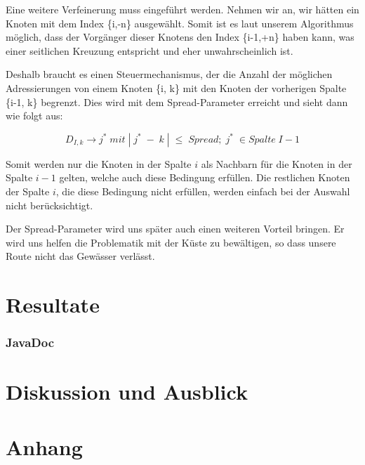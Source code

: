 \documentclass[a4paper,10pt]{article}
\begin{document}
Eine weitere Verfeinerung muss eingeführt werden. Nehmen wir an, wir hätten ein
Knoten mit dem Index \{i,-n\} ausgewählt. Somit ist es laut unserem Algorithmus
möglich, dass der Vorgänger dieser Knotens den Index \{i-1,+n\} haben kann, was
einer seitlichen Kreuzung entspricht und eher unwahrscheinlich ist.

Deshalb braucht es einen Steuermechanismus, der die Anzahl der möglichen
Adressierungen von einem Knoten \{i, k\} mit den Knoten der vorherigen Spalte
\{i-1, k\} begrenzt. Dies wird mit dem Spread-Parameter erreicht und sieht dann
wie folgt aus:

\begin{equation}
\label{eq_dyn:7}
D_{I,k} \to j^*\; mit\; |\;j^*\;-\;k\;| \;\le\; Spread;\; j^*\; \in Spalte\; I-1
\end{equation}
 
Somit werden nur die Knoten in der Spalte \(i\) als Nachbarn für die Knoten in
der Spalte \(i-1\) gelten, welche auch diese Bedingung erfüllen. Die restlichen
Knoten der Spalte \(i\), die diese Bedingung nicht erfüllen, werden einfach bei
der Auswahl nicht berücksichtigt.

Der Spread-Parameter wird uns später auch einen weiteren Vorteil bringen. Er
wird uns helfen die Problematik mit der Küste zu bewältigen, so dass
unsere Route nicht das Gewässer verlässt.






\newpage
\part{Resultate}



\section{JavaDoc}




\newpage
\part{Diskussion und Ausblick}

\newpage
\part{Anhang}
\end{document}
